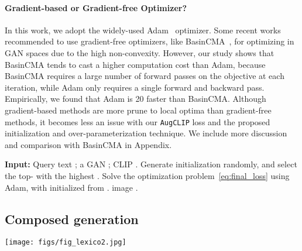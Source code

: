 \documentclass[10pt,twocolumn,letterpaper]{article}
\newcommand{\our}{\emph{FuseDream}}
\newcommand{\ourloss}{\texttt{AugCLIP}}
\newcommand{\ourcomp}{\our\emph{-Composition}}
\begin{document}
\paragraph{Gradient-based or Gradient-free Optimizer?} 
In this work, we adopt the widely-used Adam~\cite{kingma2015adam} optimizer.
Some recent works recommended to use 
gradient-free optimizers, 
like BasinCMA~\cite{wampler2009optimal, bau2019seeing, huh2020transforming}, 
for optimizing in GAN spaces due to the high non-convexity. 
However, our study shows  that BasinCMA 
tends to cast a higher computation cost than Adam,  because  BasinCMA requires  a large number of forward passes 
on the objective at each iteration, while Adam only requires a single forward and backward pass. 
Empirically, we found that Adam is 20 faster than BasinCMA.
Although gradient-based methods 
are more prune to local optima than gradient-free methods, 
it becomes less an issue with our {\ourloss} loss and the proposed initialization and over-parameterization technique. 
We include more discussion and comparison with BasinCMA in  Appendix.



\begin{algorithm}[t]
\caption{{\our} (with single image generation)} 
\label{alg:single}
\begin{algorithmic}[1]
\STATE \textbf{Input:} Query text ; 
a GAN ; CLIP .  
\STATE Generate  initialization  randomly, 
and  select the top-   with the highest 
 . 
\STATE Solve 
the optimization problem~\eqref{eq:final_loss}
using Adam,  with  initialized from . 
\RETURN  image .
\end{algorithmic}
\end{algorithm}

\subsection{ Composed generation} \label{subsec:fusion}

\begin{figure*}
    \centering
    \texttt{[image: figs/fig\_lexico2.jpg]}
    \caption{\textcolor{black}{Red box}: Image generated by {\ourcomp} on  \emph{`An elephant on top of a roof'}. 
    \textcolor{black}{Blue box}: Image given by composed generation that only optimizes the {\ourloss} score  without considering the perceptual loss ,  which shows a clear discontinuity between  and . 
\textcolor{black}{Yellow box}: Image given by {\our} without composition, 
which has a less clear elephant without nose and unrecognizable `roof', 
    because BigGAN cannot handle composed concepts well.
\textcolor{black}{Green Box}: The {\ourloss} score  and perceptual loss  vs. iteration using the algorithm in \eqref{eq:lexico_update}.  
    Note that the generated images in blue and red boxes have similar {\ourloss},  indicating that the bi-level optimization 
    can improve  for free without scarifying . 
The white dashed box on  indicates the position and size of .  
Notice how the style and the color of  and  slowly unify across the iteration. }
    \label{fig:lexico}
    \vspace{-10pt}
\end{figure*}
\end{document}

